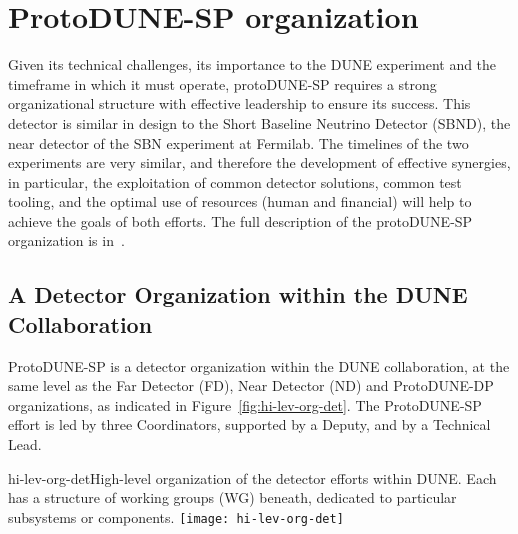
\section{ProtoDUNE-SP organization}

Given its technical challenges, its importance to the DUNE experiment and the timeframe in which it must operate, protoDUNE-SP requires a strong organizational structure with effective leadership to ensure its success. This detector is similar in design to the Short Baseline Neutrino Detector (SBND), the near detector of the SBN experiment at Fermilab. 
The timelines of the two experiments are very similar, and therefore the development of effective synergies, in particular, the exploitation of common detector solutions, common test tooling, and the optimal use of resources (human and financial) will help to achieve the goals of both efforts.  The full description of the protoDUNE-SP organization is in~\cite{pdune-sp-org}.

\subsection{A Detector Organization within the DUNE Collaboration}

ProtoDUNE-SP is a detector organization within the DUNE collaboration, at the same level as the Far Detector (FD), Near Detector (ND) and ProtoDUNE-DP organizations, as indicated in Figure~\ref{fig:hi-lev-org-det}. The ProtoDUNE-SP effort is led by three Coordinators, supported by a Deputy, and by a Technical Lead.

\begin{cdrfigure}{hi-lev-org-det}{High-level organization of the detector efforts within DUNE. Each has a structure of working groups (WG) beneath, dedicated to particular subsystems or components.}
 \texttt{[image: hi-lev-org-det]}
\end{cdrfigure}

